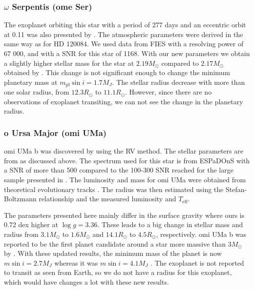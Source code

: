 \documentclass{aa}
\begin{document}
\subsubsection{$\omega$ Serpentis (ome Ser)}
\label{sub:ome_Ser}
The exoplanet orbiting this star with a period of 277 days and an eccentric
orbit at 0.11 was also presented by \citet{Sato2013}. The atmospheric parameters
were derived in the same way as for HD 120084. We used data from FIES with a
resolving power of 67 000, and with a SNR for this star of 1168. With our new
parameters we obtain a slightly higher stellar mass for the star at
$2.19M_\odot$ compared to $2.17M_\odot$ obtained by \cite{Takeda2008}. This
change is not significant enough to change the minimum planetary mass at
$m_\mathrm{pl}\sin i=1.7M_J$. The stellar radius decrease with more than one
solar radius, from $12.3R_\odot$ to $11.1R_\odot$. However, since there are no
observations of exoplanet transiting, we can not see the change in the planetary
radius.



\subsubsection{o Ursa Major (omi UMa)}
\label{sub:omiUMa}
omi UMa b was discovered by \citet{Sato2012} using the RV method. The stellar
parameters are from \citet{Takeda2008} as discussed above. The spectrum used for
this star is from ESPaDOnS with a SNR of more than 500 compared to the 100-300
SNR reached for the large sample presented in \citet{Takeda2008}. The luminosity
and mass for omi UMa were obtained from theoretical evolutionary tracks
\citep[see][and references therein]{Sato2012}. The radius was then estimated
using the Stefan-Boltzmann relationship and the measured luminosity and
$T_\mathrm{eff}$.

The parameters presented here mainly differ in the surface gravity where ours is
0.72 dex higher at $\log g=3.36$. These leads to a big change in stellar mass
and radius from $3.1M_\odot$ to $1.6M_\odot$ and $14.1R_\odot$ to $4.5R_\odot$,
respectively. omi UMa b was reported to be the first planet candidate around a
star more massive than $3M_\odot$ by \citet{Sato2012}. With these updated
results, the minimum mass of the planet is now $m\sin i=2.7M_J$ whereas it was
$m\sin i=4.1M_J$ \citep{Sato2012}. The exoplanet is not reported to transit as
seen from Earth, so we do not have a radius for this exoplanet, which would have
changes a lot with these new results.
\end{document}
